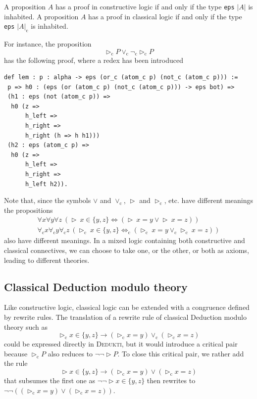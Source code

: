 \documentclass[english]{lipics}
\newcommand\fa{\forall}
\newcommand\lra{\longrightarrow}
\DeclareMathOperator{\ato}{\triangleright}
\newcommand\lst[1]{{\rm \lstinline{#1}}}
\begin{document}
\begin{theorem} A proposition $A$ has a proof in constructive logic
  if and only if the type \lst{eps} $|A|$ is inhabited. A proposition
  $A$ has a proof in classical logic if and only if the type
  \lst{eps} $|A|_{\mathrm c}$ is inhabited.
\end{theorem}

For instance, the proposition
$$\ato_{\mathrm c} P \vee_{\mathrm c} \neg_{\mathrm c} \ato_{\mathrm c} P$$
has the following proof, where a redex has been introduced
\begin{lstlisting}
def lem : p : alpha -> eps (or_c (atom_c p) (not_c (atom_c p))) :=
 p => h0 : (eps (or (atom_c p) (not_c (atom_c p))) -> eps bot) =>
 (h1 : eps (not (atom_c p)) =>
  h0 (z =>
      h_left =>
      h_right =>
      h_right (h => h h1)))
 (h2 : eps (atom_c p) =>
  h0 (z =>
      h_left =>
      h_right =>
      h_left h2)).
\end{lstlisting}

Note that, since the symbols $\vee$ and $\vee_{\mathrm c}$, $\ato$ and $\ato_{\mathrm c}$, etc.
have different meanings the propositions
$$
\begin{array}{c}
  \fa x\fa y \fa z~(\ato~x \in \{y, z\} \Leftrightarrow (\ato~x = y \vee
  \ato~x = z))\\
  \fa_{\mathrm c} x\fa_{\mathrm c} y \fa_{\mathrm c} z~(\ato_{\mathrm c}~x \in \{y, z\} \Leftrightarrow_{\mathrm c}
  (\ato_{\mathrm c}~x = y \vee_{\mathrm c} \ato_{\mathrm c}~x = z))
\end{array}
$$
also have different meanings. In a mixed logic containing both
constructive and classical connectives, we can choose to take one, or
the other, or both as axioms, leading to different theories.

\subsection{Classical Deduction modulo theory}

Like constructive logic, classical logic can be extended with
a congruence defined by rewrite rules.
The translation of a rewrite rule of classical Deduction modulo theory
such as
$$\ato_{\mathrm c} x \in \{y, z\} \lra (\ato_{\mathrm c} x = y) \vee_{\mathrm c} (\ato_{\mathrm c} x = z)$$
could be expressed directly in \textsc{Dedukti}, but it would
introduce a critical pair because $\ato_{\mathrm c} P$ also reduces to $\neg
\neg \ato P$. To close this critical pair, we rather add the rule
$$\ato x \in \{y, z\} \lra (\ato_{\mathrm c} x = y) \vee (\ato_{\mathrm c} x = z)$$
that subsumes the first one
as $\neg \neg \ato  x \in \{y, z\}$ then rewrites to
$\neg \neg ((\ato_{\mathrm c} x = y) \vee (\ato_{\mathrm c} x = z))$.
\end{document}

